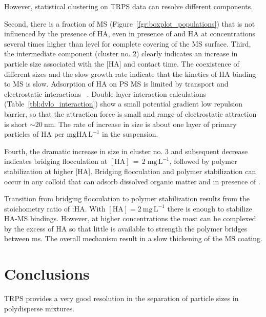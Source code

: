 \documentclass[journal=langd5,manuscript=article]{achemso}
\begin{document}
However, statistical clustering on TRPS data can resolve different components.


Second, there is a fraction of MS (Figure~\ref{fgr:boxplot_populations})
that is not influenced by the presence of HA, even in presence of 
and HA at concentrations several times higher than level for complete
covering of the MS surface.
Third, the intermediate component (cluster no. 2) clearly indicates  an
increase in particle size associated with the [HA] and
contact time. The coexistence of different sizes and the
slow  growth rate indicate that the kinetics of HA binding
to MS is slow. Adsorption of HA on PS MS is limited by
transport and electrostatic interactions~ \cite{doi:10.1021/es981236u}.
Double layer interaction calculations (Table~\ref{tbl:dvlo_interaction}) show a small potential gradient  low  repulsion barrier,
so that the attraction force  is small  and range of electrostatic attraction is short $\sim 20~\mathrm{nm}$.
The rate of increase in size is about one  layer of primary particles of HA per $\mathrm{mg HA\,L^{-1}}$ in the suspension.

Fourth, the dramatic increase in size in cluster no. 3 
and subsequent decrease indicates bridging flocculation at 
$\mathrm{[HA] \,=\, 2\;mg\,L^{-1}}$, followed by polymer stabilization at higher [HA]. %
Bridging flocculation and polymer stabilization can occur in any colloid that can adsorb dissolved organic matter and in presence of .

Transition from bridging flocculation to polymer stabilization results from the stoichometry ratio of 
:HA.
With 
$\mathrm{[HA]} = 2~\mathrm{mg\,L^{-1}}$ there is enough 
 to stabilize HA-MS bindings. However, at higher concentrations
the most
can be  complexed by the excess of HA  so that little
is available to strength the polymer bridges between ms.
The overall mechanism  result in a slow thickening of the MS coating. 

\section{Conclusions}


TRPS provides a very good resolution in the separation  of particle sizes in polydisperse mixtures.
\end{document}
